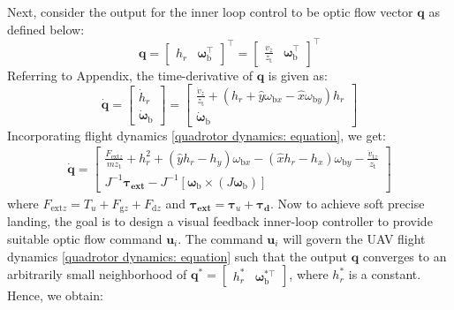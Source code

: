 \documentclass[lettersize,journal]{IEEEtran}
\begin{document}
Next, consider the output for the inner loop control to be optic flow vector $\boldsymbol{q}$ as defined below:
\begin{equation}
    \boldsymbol{q} = \begin{bmatrix} h_r & \boldsymbol{\omega}_{\text{b}}^{\top} \end{bmatrix}^{\top} = \begin{bmatrix} \frac{v_z}{z_{\text{t}}} & \boldsymbol{\omega}_{\text{b}}^{\top}
    \end{bmatrix}^{\top}
\end{equation}
Referring to Appendix, the time-derivative of $\boldsymbol{q}$ is given as:
\begin{equation}
    \dot{\boldsymbol{q}} = \begin{bmatrix} \dot{h}_r \\ \dot{\boldsymbol{\omega}}_{\text{b}} \end{bmatrix} = \begin{bmatrix}
        \frac{\dot{v}_z}{z_{\text{t}}} + \left( h_r + \hat{y} \omega_{\text{b}x} - \hat{x} \omega_{\text{b}y} \right) h_r \\ \dot{\boldsymbol{\omega}}_{\text{b}}
    \end{bmatrix}
\end{equation}
Incorporating flight dynamics \eqref{quadrotor dynamics: equation}, we get:
\begin{align}
    \dot{\boldsymbol{q}} = \begin{bmatrix}
        \frac{F_{\text{ext}z}}{m z_{\text{t}}} + h_r^2 + \left( \hat{y} h_r - h_y \right) \omega_{\text{b}x} - \left( \hat{x} h_r - h_x \right) \omega_{\text{b}y} - \frac{\dot{v}_{\text{t}z}}{z_{\text{t}}} \\ J^{-1} \boldsymbol{\tau_{\text{ext}}} - J^{-1} \left[ \boldsymbol{\omega}_{\text{b}} \times (J \boldsymbol{\omega}_{\text{b}}) \right]
    \end{bmatrix}
\end{align}
where $F_{\text{ext}z} = T_u + F_{\text{g}z} + F_{\text{d}z}$ and $\boldsymbol{\tau_{\text{ext}}} = \boldsymbol{\tau}_u + \boldsymbol{\tau_{\text{d}}}$.
Now to achieve soft precise landing, the goal is to design a visual feedback inner-loop controller to provide suitable optic flow command $\boldsymbol{u}_i$. The command $\boldsymbol{u}_i$ will govern
the UAV flight dynamics \eqref{quadrotor dynamics: equation} such that the output $\boldsymbol{q}$ converges to an arbitrarily small neighborhood of $\boldsymbol{q}^* = \begin{bmatrix} h_r^* & \boldsymbol{\omega}_{\text{b}}^{*\top} \end{bmatrix}$, where $h_r^*$ is a constant. Hence, we obtain:
\end{document}
